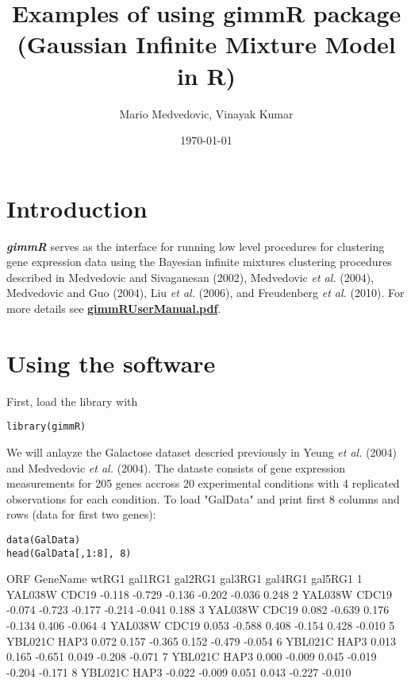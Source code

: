 \documentclass[12pt]{article}
\begin{document}
\title{Examples of using gimmR package \\(Gaussian Infinite Mixture Model in R)}
\author{Mario Medvedovic, Vinayak Kumar}
\date{\today}
\maketitle

\section{Introduction}
\textbf{\textit{gimmR}} serves as the interface for running low level procedures for clustering gene expression data using the Bayesian infinite mixtures clustering procedures described in Medvedovic and Sivaganesan (2002), Medvedovic \textit{et al.} (2004), Medvedovic and Guo (2004), Liu \textit{et al.} (2006), and Freudenberg \textit{et al.} (2010). For more details see \underline{\textbf{gimmRUserManual.pdf}}.

\section{Using the software}
First, load the library with
\begin{verbatim}
library(gimmR)
\end{verbatim}


We will anlayze the Galactose dataset descried previously in Yeung \textit{et al.} (2004) and Medvedovic \textit{et al.} (2004). The dataste consists of gene expression measurements for 205 genes accross 20 experimental conditions with 4 replicated observations for each condition. To load "GalData" and print first 8 columns and rows (data for first two genes):

\begin{verbatim}
data(GalData)
head(GalData[,1:8], 8)
\end{verbatim}

\begin{Schunk}
\begin{Soutput}
      ORF GeneName  wtRG1 gal1RG1 gal2RG1 gal3RG1 gal4RG1 gal5RG1
1 YAL038W    CDC19 -0.118  -0.729  -0.136  -0.202  -0.036   0.248
2 YAL038W    CDC19 -0.074  -0.723  -0.177  -0.214  -0.041   0.188
3 YAL038W    CDC19  0.082  -0.639   0.176  -0.134   0.406  -0.064
4 YAL038W    CDC19  0.053  -0.588   0.408  -0.154   0.428  -0.010
5 YBL021C     HAP3  0.072   0.157  -0.365   0.152  -0.479  -0.054
6 YBL021C     HAP3  0.013   0.165  -0.651   0.049  -0.208  -0.071
7 YBL021C     HAP3  0.000  -0.009   0.045  -0.019  -0.204  -0.171
8 YBL021C     HAP3 -0.022  -0.009   0.051   0.043  -0.227  -0.010
\end{Soutput}
\end{Schunk}
\end{document}
